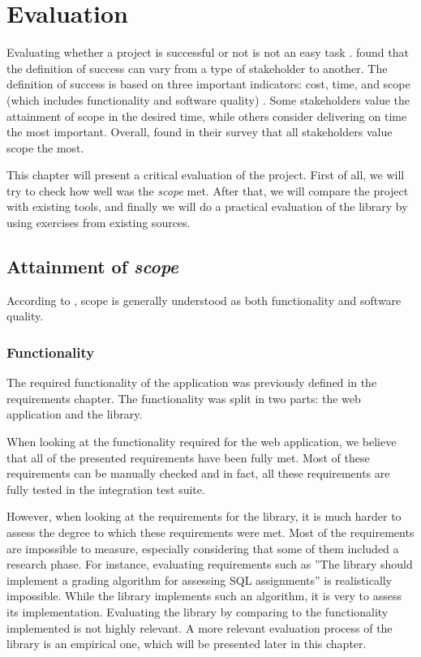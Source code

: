 \chapter{Evaluation}

Evaluating whether a project is successful or not is not an easy task \citep{lit:definining_success}. \cite{lit:definining_success} found that the definition of success can vary from a type of stakeholder to another. The definition of success is based on three important indicators: cost, time, and scope (which includes functionality and software quality) \citep{lit:definining_success}. Some stakeholders value the attainment of scope in the desired time, while others consider delivering on time the most important. Overall, \cite{lit:definining_success} found in their survey that all stakeholders value scope the most.

This chapter will present a critical evaluation of the project. First of all, we will try to check how well was the \textit{scope} met. After that, we will compare the project with existing tools, and finally we will do a practical evaluation of the library by using exercises from existing sources.

\section{Attainment of \textit{scope}}
According to \cite{lit:definining_success}, scope is generally understood as both functionality and software quality.

\subsection{Functionality}

The required functionality of the application was previously defined in the requirements chapter. The functionality was split in two parts: the web application and the library.

When looking at the functionality required for the web application, we believe that all of the presented requirements have been fully met. Most of these requirements can be manually checked and in fact, all these requirements are fully tested in the integration test suite.

However, when looking at the requirements for the library, it is much harder to assess the degree to which these requirements were met. Most of the requirements are impossible to measure, especially considering that some of them included a research phase. For instance, evaluating requirements such as ''The library should implement a grading algorithm for assessing SQL assignments'' is realistically impossible. While the library implements such an algorithm, it is very to assess its implementation. Evaluating the library by comparing to the functionality implemented is not highly relevant. A more relevant evaluation process of the library is an empirical one, which will be presented later in this chapter.

